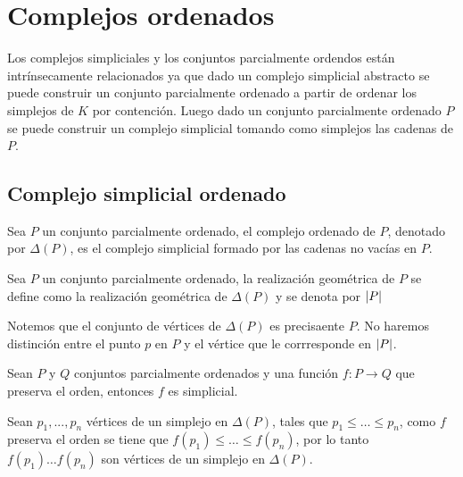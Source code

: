 \chapter{Complejos ordenados}
Los complejos simpliciales y los conjuntos parcialmente ordendos están intrínsecamente relacionados ya que dado un complejo simplicial abstracto se puede construir un conjunto parcialmente ordenado a partir de ordenar los simplejos de $K$ por contención. Luego dado un conjunto parcialmente ordenado $P$ se puede construir un complejo simplicial tomando como simplejos las cadenas de $P$. 
 
\section{Complejo simplicial ordenado}
\begin{Defi}
Sea $P$ un conjunto parcialmente ordenado, el complejo ordenado de $P$, denotado por $\Delta(P)$, es el complejo simplicial formado por las cadenas no vacías en $P$.
\end{Defi}

\begin{Defi}
Sea $P$ un conjunto parcialmente ordenado, la realización geométrica de $P$ se define como la realización geométrica de $\Delta(P)$ y se denota por $\left| P \right|$ 
\end{Defi}

Notemos que el conjunto de vértices de $\Delta(P)$ es precisaente $P$. No haremos distinción entre el punto $p$ en $P$ y el vértice que le corrresponde en $\left| P \right|$.
\begin{Teo}
Sean $P$ y $Q$ conjuntos parcialmente ordenados y una función $f\colon P \rightarrow Q$ que preserva el orden, entonces $f$ es simplicial.
\end{Teo}
\begin{Dem}
Sean $p_1,...,p_n$ vértices de un simplejo en $\Delta(P)$, tales que $p_1\leqslant\dots \leqslant p_n$, como $f$ preserva el orden se tiene que $f(p_1)\leqslant\dots \leqslant f(p_n)$, por lo tanto $f(p_1)\dots f(p_n)$ son vértices de un simplejo en $\Delta(P)$. 
\end{Dem}



